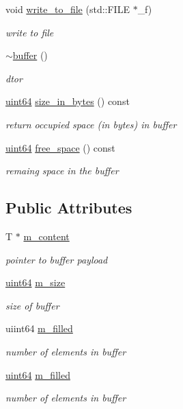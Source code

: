 \begin{DoxyCompactItemize}
void \hyperlink{structbuffer_ac31d1516df0036a19bb3e58a4a2fac8a}{write\+\_\+to\+\_\+file} (std\+::\+F\+I\+LE $\ast$\+\_\+f)
\begin{DoxyCompactList}\small\item\em write to file \end{DoxyCompactList}\item 
\hyperlink{structbuffer_accefc959744e463ae78a996a2f45f81a}{$\sim$buffer} ()
\begin{DoxyCompactList}\small\item\em dtor \end{DoxyCompactList}\item 
\hyperlink{types_8h_a60e8696a4678cd348e991a1f172e53f7}{uint64} \hyperlink{structbuffer_a2b74a935bb50716bba0835781545803d}{size\+\_\+in\+\_\+bytes} () const
\begin{DoxyCompactList}\small\item\em return occupied space (in bytes) in buffer \end{DoxyCompactList}\item 
\hyperlink{types_8h_a60e8696a4678cd348e991a1f172e53f7}{uint64} \hyperlink{structbuffer_a877157a0ddb2aa0fa10c7273eece00cb}{free\+\_\+space} () const
\begin{DoxyCompactList}\small\item\em remaing space in the buffer \end{DoxyCompactList}\end{DoxyCompactItemize}
\subsection*{Public Attributes}
\begin{DoxyCompactItemize}
\item 
T $\ast$ \hyperlink{structbuffer_a51dfd20b289c52f084b6d277c2e4745f}{m\+\_\+content}
\begin{DoxyCompactList}\small\item\em pointer to buffer payload \end{DoxyCompactList}\item 
\hyperlink{types_8h_a60e8696a4678cd348e991a1f172e53f7}{uint64} \hyperlink{structbuffer_a120b15f6f771bc004c80d12eb881623f}{m\+\_\+size}
\begin{DoxyCompactList}\small\item\em size of buffer \end{DoxyCompactList}\item 
uiint64 \hyperlink{structbuffer_af3dc3d5097b6de42b637942b1b0cf8bc}{m\+\_\+filled}
\begin{DoxyCompactList}\small\item\em number of elements in buffer \end{DoxyCompactList}\item 
\hyperlink{types_8h_a60e8696a4678cd348e991a1f172e53f7}{uint64} \hyperlink{structbuffer_af5e119495e5a739d01f5d1d109aa39b6}{m\+\_\+filled}
\begin{DoxyCompactList}\small\item\em number of elements in buffer \end{DoxyCompactList}\end{DoxyCompactItemize}


